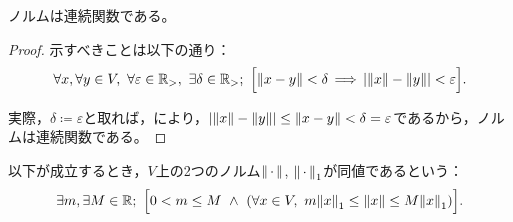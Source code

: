 \documentclass[b5paper,draft,oneside,openany]{ltjsbook} %
\begin{document}
\begin{prop}[ノルムの連続性]
    ノルムは連続関数である。
    \begin{proof}
        示すべきことは以下の通り：
        \begin{equation}
            \forall x,\forall y\in V,\ \forall \varepsilon\in\Rposi,\
                \exists \delta\in \Rposi;\ \bsqu{
                    \norm{x-y}<\delta\, \Longrightarrow\, \abs{\norm{x}-\norm{y}}<\varepsilon
                }.
        \end{equation}

        実際，$\delta\coloneqq \varepsilon$と取れば，により，$\abs{\norm{x}-\norm{y}}\leq \norm{x-y}<\delta =\varepsilon$であるから，ノルムは連続関数である。
    \end{proof}
\end{prop}

\begin{defi}[ノルムの同値性]
    以下が成立するとき，$V$上の2つのノルム$\norm{\dummy}$, $\norm{\dummy}_1$が同値であるという：
    \begin{equation}
        \exists m, \exists M\in\R;\ \bsqu{0<m\leq M\ \land \ \pare{
            \forall x\in V,\ m\norm{x}_1 \leq \norm{x} \leq M\norm{x}_1
        }}.
    \end{equation}
\end{defi}
\end{document}
